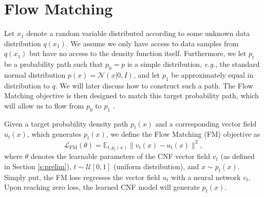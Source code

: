 \documentclass{article}
\makeatletter
\newcommand{\too}{\rightarrow}
\newcommand{\FM}{\scriptscriptstyle \text{FM}}
\newcommand{\eg}{{e.g.}}
\def\gN{{\mathcal{N}}}
\def\gU{{\mathcal{U}}}
\renewcommand*{\eg}{{\it e.g.}\@\xspace}
\makeatother
\begin{document}
\section{Flow Matching}\label{sec:flow_matching}
%
Let $x_1$ denote a random variable distributed according to some unknown data distribution $q(x_1)$.
We assume we only have access to data samples from $q(x_1)$ but have no access to the density function itself.
Furthermore, we let $p_t$ be a probability path such that $p_0=p$ is a simple distribution, \eg, the standard normal distribution $p(x) = \gN(x | 0, I)$, and let $p_1$ be approximately equal in distribution to $q$. We will later discuss how to construct such a path.
%
The Flow Matching objective is then designed to match this target probability path, which will allow us to flow from $p_0$ to $p_1$%
.



Given a target probability density path $p_t(x)$ and a corresponding vector field $u_t(x)$, which generates $p_t(x)$, we define the Flow Matching (FM) objective as 
\begin{equation}\label{e:fm}
    \mathcal{L}_{\FM }(\theta) = \mathbb{E}_{t,p_t(x)}\| v_t(x)-u_t(x) \|^2,
\end{equation}
where $\theta$ denotes the learnable parameters of the CNF vector field $v_t$ (as defined in Section \ref{s:prelim}), $t\sim \gU[0,1]$ (uniform distribution), and $x\sim p_t(x)$. Simply put, the FM loss regresses the vector field $u_t$ with a neural network $v_t$. Upon reaching zero loss, the learned CNF model will generate $p_t(x)$.
\end{document}
